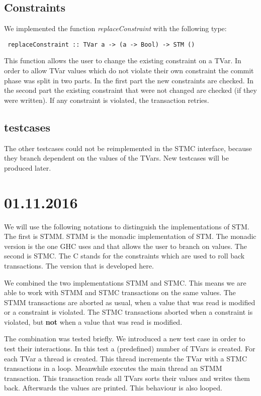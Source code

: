 \documentclass[a4paper,10pt]{article}
\begin{document}
\subsection{Constraints}
We implemented the function \textit{replaceConstraint} with the following type:
\begin{lstlisting}
 replaceConstraint :: TVar a -> (a -> Bool) -> STM ()
\end{lstlisting}
This function allows the user to change the existing constraint on a TVar. In order to allow TVar values which do not
violate their own constraint the commit phase was split in two parts.
In the first part the new constraints are checked. In the second part the existing constraint that were not changed are
checked (if they were written). If any constraint is violated, the transaction retries. 

\subsection{testcases}
The other testcases could not be reimplemented in the STMC interface, because they branch dependent on the values of the 
TVars. New testcases will be produced later. 

\section{01.11.2016}
We will use the following notations to distinguish the implementations of STM. The first is STMM. STMM is the monadic
implementation of STM. The monadic version is the one GHC uses and that allows the user to branch on values. 
The second is STMC. The C stands for the constraints which are used to roll back transactions. The version that is
developed here. 

We combined the two implementations STMM and STMC. This means we are able to work with STMM and STMC transactions on 
the same values. The STMM transactions are aborted as usual, when a value that was read is modified or a constraint
is violated. The STMC transactions aborted when a constraint is violated, but \textbf{not} when a value that was read
is modified.

The combination was tested briefly. We introduced a new test case in order to test their interactions. 
In this test a (predefined) number of TVars is created. For each TVar a thread is created. This thread
increments the TVar with a STMC transactions in a loop. Meanwhile executes the main thread an STMM transaction.
This transaction reads all TVars sorts their values and writes them back. Afterwards the values are printed.
This behaviour is also looped. 
\end{document}
